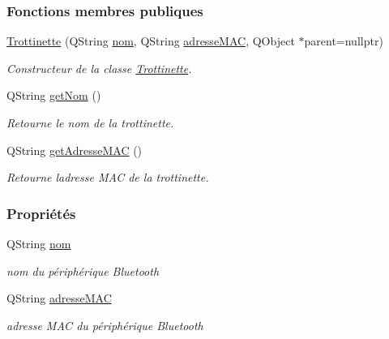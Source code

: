 \subsubsection*{Fonctions membres publiques}
\begin{DoxyCompactItemize}
\item 
\hyperlink{class_trottinette_ab3c84f129214e5dcf8f9d11cf7f3e3e0}{Trottinette} (Q\+String \hyperlink{class_trottinette_aab7d536bd21b3dbf0b9cca5508db40ab}{nom}, Q\+String \hyperlink{class_trottinette_acd01acc5c1cbf23b9b527401282f1136}{adresse\+M\+AC}, Q\+Object $\ast$parent=nullptr)
\begin{DoxyCompactList}\small\item\em Constructeur de la classe \hyperlink{class_trottinette}{Trottinette}. \end{DoxyCompactList}\item 
Q\+String \hyperlink{class_trottinette_a9b191a43bacb534dca0727aedd3076cd}{get\+Nom} ()
\begin{DoxyCompactList}\small\item\em Retourne le nom de la trottinette. \end{DoxyCompactList}\item 
Q\+String \hyperlink{class_trottinette_a4d319bfda23b3d871b62e3e910cc204d}{get\+Adresse\+M\+AC} ()
\begin{DoxyCompactList}\small\item\em Retourne l\textquotesingle{}adresse M\+AC de la trottinette. \end{DoxyCompactList}\end{DoxyCompactItemize}
\subsubsection*{Propriétés}
\begin{DoxyCompactItemize}
\item 
Q\+String \hyperlink{class_trottinette_aab7d536bd21b3dbf0b9cca5508db40ab}{nom}
\begin{DoxyCompactList}\small\item\em nom du périphérique Bluetooth \end{DoxyCompactList}\item 
Q\+String \hyperlink{class_trottinette_acd01acc5c1cbf23b9b527401282f1136}{adresse\+M\+AC}
\begin{DoxyCompactList}\small\item\em adresse M\+AC du périphérique Bluetooth \end{DoxyCompactList}\end{DoxyCompactItemize}



